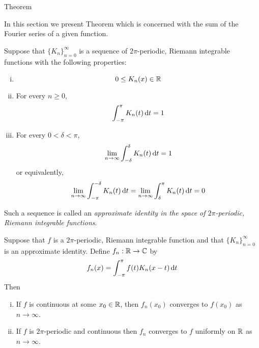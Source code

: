\begin{section}{\fejers Theorem}

	In this section we present \fejers Theorem
	which is concerned with the \cesaro sum of
	the Fourier series of a given function.
	

\begin{defn}
	Suppose that $\{K_n\}_{n=0}^\infty$ is a sequence
	of $2\pi$-periodic, Riemann integrable functions
	with the following properties:
		\begin{enumerate}[i)]
			\item
				\begin{displaymath}
					0 \leq K_n(x) \in \real
				\end{displaymath}
			\item
				For every $n \geq 0$,
					\begin{displaymath}
						\myintb[\pi]{K_n(t)}{t} = 1
					\end{displaymath}
			\item
				For every $0 < \delta < \pi$,
					\begin{displaymath}
						\lim_{n \rightarrow \infty}
							\myintb[\delta]{K_n(t)}{t} = 1
					\end{displaymath}
				or equivalently,
					\begin{displaymath}
						\lim_{n \rightarrow \infty}
							\myinta{-\pi}{-\delta}{K_n(t)}{t}
							= \lim_{n \rightarrow \infty}
							\myinta{\delta}{\pi}{K_n(t)}{t}
							= 0
					\end{displaymath}
		\end{enumerate}
	Such a sequence is called an \emph{approximate identity in
	the space of $2\pi$-periodic, Riemann integrable functions}.
\end{defn}
	

\begin{thrm}\label{thrm:ApproxIdentity}
	Suppose that $f$ is a $2\pi$-periodic, Riemann integrable
	function and that $\{K_n\}_{n=0}^\infty$ is an approximate
	identity. Define $f_n:\real \to \cmplx$ by
		\begin{displaymath}
			f_n(x) = \myintb[\pi]{f(t)K_n(x-t)}{t}
		\end{displaymath}
	Then
		\begin{enumerate}[i)]
			\item
				If $f$ is continuous at some $x_0 \in \real$, then
				$f_n(x_0)$ converges to $f(x_0)$ as $n \rightarrow
				\infty$.
			\item
				If $f$ is $2\pi$-periodic and continuous then
				$f_n$ converges to $f$ uniformly on $\real$ as $n \rightarrow \infty$.
		\end{enumerate}
\end{thrm}


\end{section}
